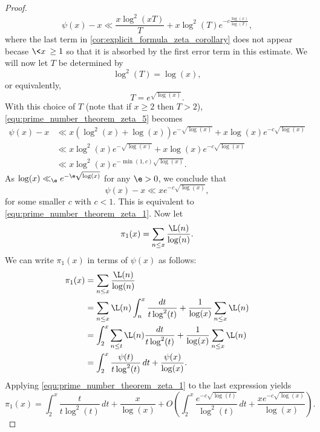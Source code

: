 \begin{proof}
        \begin{equation}\label{equ:prime_number_theorem_zeta_5}
          \psi(x)-x \ll \frac{x\log^{2}(xT)}{T}+x\log^{2}(T)e^{-c\frac{\log(x)}{\log(T)}},
        \end{equation}
        where the last term in \cref{cor:explicit_formula_zeta_corollary} does not appear becase $\<x\> \ge 1$ so that it is absorbed by the first error term in this estimate. We will now let $T$ be determined by
        \[
          \log^{2}(T) = \log(x),
        \]
        or equivalently,
        \[
          T = e^{\sqrt{\log(x)}}.
        \]
        With this choice of $T$ (note that if $x \ge 2$ then $T > 2$), \cref{equ:prime_number_theorem_zeta_5} becomes
        \begin{align*}
          \psi(x)-x &\ll x\left(\log^{2}(x)+\log(x)\right)e^{-\sqrt{\log(x)}}+x\log(x)e^{-c\sqrt{\log(x)}} \\
          &\ll x\log^{2}(x)e^{-\sqrt{\log(x)}}+x\log(x)e^{-c\sqrt{\log(x)}} \\
          &\ll x\log^{2}(x)e^{-\min(1,c)\sqrt{\log(x)}}.
        \end{align*}
        As $\log(x) \ll_{\e} e^{-\e\sqrt{\log(x)}}$ for any $\e > 0$, we conclude that
        \[
          \psi(x)-x \ll xe^{-c\sqrt{\log(x)}},
        \]
        for some smaller $c$ with $c < 1$. This is equivalent to \cref{equ:prime_number_theorem_zeta_1}. Now let
        \[
          \pi_{1}(x) = \sum_{n \le x}\frac{\L(n)}{\log(n)}.
        \]
        We can write $\pi_{1}(x)$ in terms of $\psi(x)$ as follows:
        \begin{align*}
          \pi_{1}(x) &= \sum_{n \le x}\frac{\L(n)}{\log(n)} \\
          &= \sum_{n \le x}\L(n)\int_{n}^{x}\frac{dt}{t\log^{2}(t)}+\frac{1}{\log(x)}\sum_{n \le x}\L(n) \\
          &= \int_{2}^{x}\sum_{n \le t}\L(n)\frac{dt}{t\log^{2}(t)}+\frac{1}{\log(x)}\sum_{n \le x}\L(n) \\
          &= \int_{2}^{x}\frac{\psi(t)}{t\log^{2}(t)}\,dt+\frac{\psi(x)}{\log(x)}.
        \end{align*}
        Applying \cref{equ:prime_number_theorem_zeta_1} to the last expression yields
        \begin{equation}\label{equ:prime_number_theorem_zeta_6}
          \pi_{1}(x) = \int_{2}^{x}\frac{t}{t\log^{2}(t)}\,dt+\frac{x}{\log(x)}+O\left(\int_{2}^{x}\frac{e^{-c\sqrt{\log(t)}}}{\log^{2}(t)}\,dt+\frac{xe^{-c\sqrt{\log(x)}}}{\log(x)}\right).
        \end{equation}

\end{proof}
